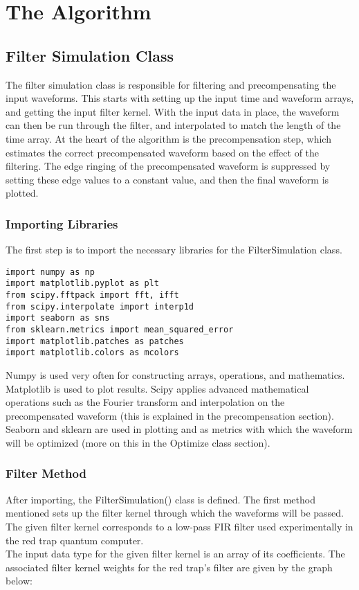 \documentclass[11pt, a4paper]{article}
\theoremstyle{definition}
\numberwithin{equation}{section}
\begin{document}
\section{The Algorithm}
\subsection{Filter Simulation Class}
The filter simulation class is responsible for filtering and precompensating the input waveforms. This starts with setting up the input time and waveform arrays, and getting the input filter kernel. With the input data in place, the waveform can then be run through the filter, and interpolated to match the length of the time array. At the heart of the algorithm is the precompensation step, which estimates the correct precompensated waveform based on the effect of the filtering. The edge ringing of the precompensated waveform is suppressed by setting these edge values to a constant value, and then the final waveform is plotted.
\subsubsection{Importing Libraries}

The first step is to import the necessary libraries for the FilterSimulation class.

\begin{verbatim}
import numpy as np
import matplotlib.pyplot as plt
from scipy.fftpack import fft, ifft
from scipy.interpolate import interp1d
import seaborn as sns
from sklearn.metrics import mean_squared_error
import matplotlib.patches as patches
import matplotlib.colors as mcolors 
\end{verbatim}

Numpy is used very often for constructing arrays, operations, and mathematics. Matplotlib is used to plot results. Scipy applies advanced mathematical operations such as the Fourier transform and interpolation on the precompensated waveform (this is explained in the precompensation section). Seaborn and sklearn are used in plotting and as metrics with which the waveform will be optimized (more on this in the Optimize class section).

\subsubsection{Filter Method}

After importing, the FilterSimulation() class is defined. The first method mentioned sets up the filter kernel through which the waveforms will be passed. The given filter kernel corresponds to a low-pass FIR filter used experimentally in the red trap quantum computer. 
\\
The input data type for the given filter kernel is an array of its coefficients. The associated filter kernel weights for the red trap's filter are given by the graph below:
\end{document}

